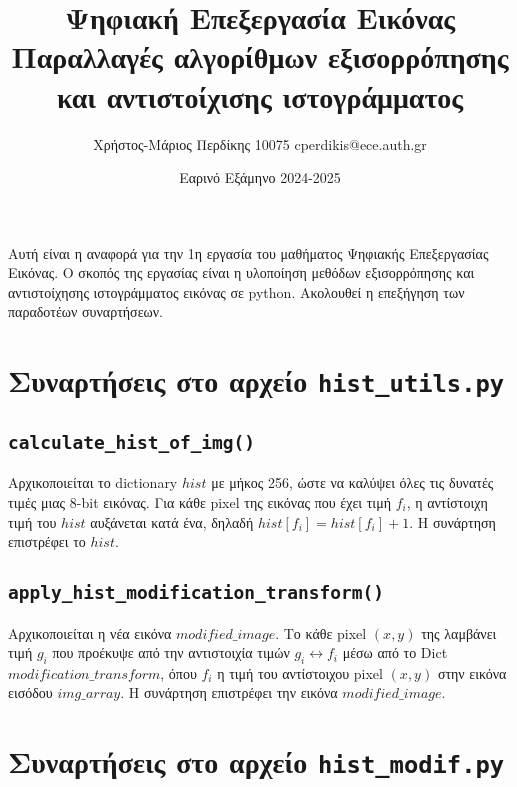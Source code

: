 \documentclass{article}
\title{Ψηφιακή Επεξεργασία Εικόνας \\ Παραλλαγές αλγορίθμων εξισορρόπησης και 
αντιστοίχισης ιστογράμματος}
\date{Εαρινό Εξάμηνο 2024-2025}
\author{Χρήστος-Μάριος Περδίκης 10075 cperdikis@ece.auth.gr}
\begin{document}
\maketitle

Αυτή είναι η αναφορά για την 1η εργασία του μαθήματος Ψηφιακής Επεξεργασίας 
Εικόνας. Ο σκοπός της εργασίας είναι η υλοποίηση μεθόδων εξισορρόπησης και 
αντιστοίχησης ιστογράμματος εικόνας σε python. Ακολουθεί η επεξήγηση των 
παραδοτέων συναρτήσεων.

\section{Συναρτήσεις στο αρχείο \texttt{hist\_utils.py}}
\subsection{\texttt{calculate\_hist\_of\_img()}}
Αρχικοποιείται το dictionary $hist$ με μήκος 256, ώστε να καλύψει όλες τις δυνατές 
τιμές μιας 8-bit εικόνας. Για κάθε pixel της εικόνας που έχει τιμή $f_i$, 
η αντίστοιχη τιμή του $hist$ αυξάνεται κατά ένα, δηλαδή $hist[f_i] = hist[f_i] + 1$.
Η συνάρτηση επιστρέφει το $hist$.

\subsection{\texttt{apply\_hist\_modification\_transform()}}
Αρχικοποιείται η νέα εικόνα $modified\_image$. Το κάθε pixel $(x, y)$ της λαμβάνει
τιμή $g_i$ που προέκυψε από την αντιστοιχία τιμών $g_i \leftrightarrow f_i$ μέσω από το
Dict $modification\_transform$, όπου $f_i$ η τιμή του αντίστοιχου pixel $(x, y)$
στην εικόνα εισόδου $img\_array$. Η συνάρτηση επιστρέφει την εικόνα $modified\_image$.

\section{Συναρτήσεις στο αρχείο \texttt{hist\_modif.py}}
\end{document}
